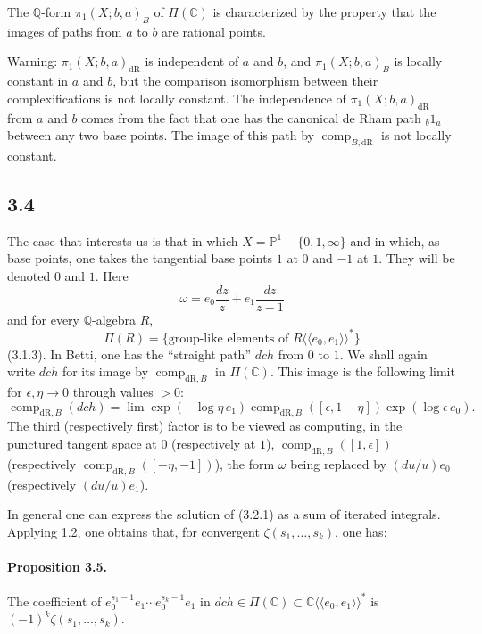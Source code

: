 \documentclass[10pt]{article}
\newcommand{\Q}{\mathbb Q}
\newcommand{\C}{\mathbb C}
\newcommand{\PP}{\mathbb P}
\newcommand{\comp}{\operatorname{comp}}
\newcommand{\dR}{\mathrm{dR}}
\begin{document}
The $\Q$-form $\pi_1(X;b,a)_B$ of $\Pi(\C)$ is characterized by the property that the images of paths from $a$ to $b$ are rational points.

Warning: $\pi_1(X;b,a)_{\dR}$ is independent of $a$ and $b$, and $\pi_1(X;b,a)_B$ is locally constant in $a$ and $b$, but the comparison isomorphism between their complexifications is not locally constant.
The independence of $\pi_1(X;b,a)_{\dR}$ from $a$ and $b$ comes from the fact that one has the canonical de Rham path ${}_b1_a$ between any two base points.
The image of this path by $\comp_{B,\dR}$ is not locally constant.

\subsection*{3.4}
The case that interests us is that in which $X=\PP^1-\{0,1,\infty\}$ and in which, as base points, one takes the tangential base points $1$ at $0$ and $-1$ at $1$.
They will be denoted $0$ and $1$.
Here
\[
 \omega=e_0\frac{dz}{z}+e_1\frac{dz}{z-1}
\]
and for every $\Q$-algebra $R$,
\[
 \Pi(R)=\{\text{group-like elements of }R\langle\!\langle e_0,e_1\rangle\!\rangle^*\}
\]
(3.1.3).
In Betti, one has the ``straight path'' $dch$ from $0$ to $1$.
We shall again write $dch$ for its image by $\comp_{\dR,B}$ in $\Pi(\C)$.
This image is the following limit for $\epsilon,\eta\to0$ through values $>0$:
\begin{equation}
\comp_{\dR,B}(dch)=\lim \exp(-\log\eta\,e_1)\comp_{\dR,B}([\epsilon,1-\eta])\exp(\log\epsilon\,e_0).
\tag{3.4.1}
\end{equation}
The third (respectively first) factor is to be viewed as computing, in the punctured tangent space at $0$ (respectively at $1$), $\comp_{\dR,B}([1,\epsilon])$ (respectively $\comp_{\dR,B}([-\eta,-1])$), the form $\omega$ being replaced by $(du/u)e_0$ (respectively $(du/u)e_1$).

In general one can express the solution of (3.2.1) as a sum of iterated integrals.
Applying 1.2, one obtains that, for convergent $\zeta(s_1,\ldots,s_k)$, one has:

\paragraph{Proposition 3.5.}
The coefficient of $e_0^{s_1-1}e_1\cdots e_0^{s_k-1}e_1$ in
$dch\in\Pi(\C)\subset\C\langle\!\langle e_0,e_1\rangle\!\rangle^*$ is
$(-1)^k\zeta(s_1,\ldots,s_k)$.
\end{document}
